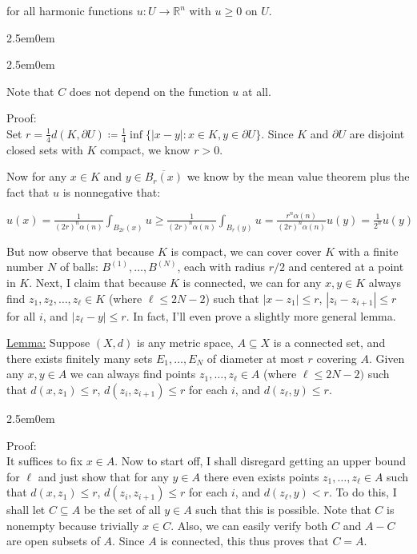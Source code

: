 \documentclass{book}
\newcommand{\myComment}{%
   \color{RawerSienna}%
   \fontsize{12}{14}\selectfont%
}
\newcommand{\exThreeP}{%
   \color{RedViolet}%
   \fontsize{12}{14}\selectfont%
}
\newcommand{\exPPP}{%
   \color{VioletRed}%
   \fontsize{12}{14}\selectfont%
}
\newenvironment{myIndent}{%
   \begin{adjustwidth}{2.5em}{0em}%
}{%
   \end{adjustwidth}%
}
\newcommand{\retTwo}{\hfill\bigbreak}
\begin{document}
for all harmonic functions $u: U \to \mathbb{R}^n$ with $u \geq 0$ on $U$.
\begin{myIndent}\exThreeP
	\begin{myIndent}\myComment
		Note that $C$ does not depend on the function $u$ at all.\retTwo
	\end{myIndent}

	Proof:\\
	Set $r = \frac{1}{4}d(K, \partial U) \coloneqq \frac{1}{4}\inf\{|x - y| : x \in K, y \in \partial U\}$. Since $K$ and $\partial U$ are disjoint closed sets with $K$ compact, we know $r > 0$.\retTwo

	Now for any $x \in K$ and $y \in \overline{B_r(x)}$ we know by the mean value theorem plus the fact that $u$ is nonnegative that:
	
	{\centering$u(x) = \frac{1}{(2r)^n \alpha(n)}\int_{B_{2r}(x)}u \geq \frac{1}{(2r)^n\alpha(n)}\int_{B_{r}(y)}u = \frac{r^n \alpha(n)}{(2r)^n \alpha(n)}u(y) = \frac{1}{2^n}u(y)$\retTwo\par}

	But now observe that because $K$ is compact, we can cover cover $K$ with a finite number $N$ of balls: $B^{(1)}, \ldots, B^{(N)}$, each with radius $r/2$ and centered at a point in $K$. Next, I claim that because $K$ is connected, we can for any $x, y \in K$ always find $z_1, z_2, \ldots, z_\ell \in K$ (where $\ell \leq 2N - 2$) such that $|x - z_1| \leq r$, $|z_i - z_{i+1}| \leq r$ for all $i$, and $|z_\ell - y| \leq r$. In fact, I'll even prove a slightly more general lemma.\retTwo

	\ul{Lemma:} Suppose $(X, d)$ is any metric space, $A \subseteq X$ is a connected set, and there exists finitely many sets $E_1, \ldots, E_N$ of diameter at most $r$ covering $A$. Given any $x, y \in A$ we can always find points $z_1, \ldots, z_\ell \in A$ (where $\ell \leq 2N - 2)$ such that $d(x, z_1) \leq r$, $d(z_i, z_{i+1}) \leq r$ for each $i$, and $d(z_\ell, y) \leq r$.
	\begin{myIndent}\exPPP
		Proof:\\
		It suffices to fix $x \in A$. Now to start off, I shall disregard getting an upper bound for $\ell$ and just show that for any $y \in A$ there even exists points $z_1, \ldots, z_\ell \in A$ such that $d(x, z_1) \leq r$, $d(z_i, z_{i+1}) \leq r$ for each $i$, and $d(z_\ell, y) < r$. To do this, I shall let $C \subseteq A$ be the set of all $y \in A$ such that this is possible. Note that $C$ is nonempty because trivially $x \in C$. Also, we can easily verify both $C$ and $A - C$ are open subsets of $A$. Since $A$ is connected, this thus proves that $C = A$.\retTwo


\end{myIndent}
\end{myIndent}
\end{document}
